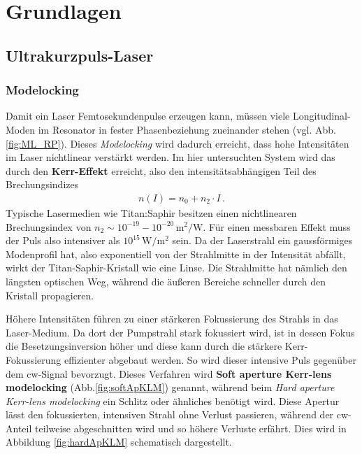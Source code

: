 \documentclass[bachelor,       %
               twoside,        %
               BCOR10mm,       %
               liststotoc,nomtotoc,bibtotoc, %
               english,ngerman, %
               final,          %
               ]{GAUBM}
\begin{document}
\chapter{Grundlagen}

\section{Ultrakurzpuls-Laser}
\subsection{Modelocking}
Damit ein Laser Femtosekundenpulse erzeugen kann, müssen viele Longitudinal-Moden im Resonator in fester Phasenbeziehung zueinander stehen (vgl. Abb.\ref{fig:ML_RP}).
Dieses \emph{Modelocking} wird dadurch erreicht, dass hohe Intensitäten im Laser nichtlinear verstärkt werden.
Im hier untersuchten System wird das durch den \textbf{Kerr-Effekt} erreicht, also den intensitätsabhängigen Teil des Brechungsindizes \cite[S.165]{agrawal_nonlinear_2001}
\begin{align}
	n(I)=n_0+n_2\cdot I\,.
	\label{eq:kerr}
\end{align}
Typische Lasermedien wie Titan:Saphir besitzen einen nichtlinearen Brechungsindex von $n_2\sim 10^{-19}-10^{-20}\,\si{\meter^2\per\watt}$.
Für einen messbaren Effekt muss der Puls also intensiver als $10^{15}\,\si{\watt\per\meter^2}$ sein.
Da der Laserstrahl ein gaussförmiges Modenprofil hat, also exponentiell von der Strahlmitte in der Intensität abfällt, wirkt der Titan-Saphir-Kristall wie eine Linse.
Die Strahlmitte hat nämlich den längsten optischen Weg, während die äußeren Bereiche schneller durch den Kristall propagieren.

Höhere Intensitäten führen zu einer stärkeren Fokussierung des Strahls in das Laser-Medium.
Da dort der Pumpstrahl stark fokussiert wird, ist in dessen Fokus die Besetzungsinversion höher und diese kann durch die stärkere Kerr-Fokussierung effizienter abgebaut werden.
So wird dieser intensive Puls gegenüber dem cw-Signal bevorzugt.
Dieses Verfahren wird \textbf{Soft aperture Kerr-lens modelocking} (Abb.\ref{fig:softApKLM}) genannt, während beim \textit{Hard aperture Kerr-lens modelocking} ein Schlitz oder ähnliches benötigt wird.
Diese Apertur lässt den fokussierten, intensiven Strahl ohne Verlust passieren, während der cw-Anteil teilweise abgeschnitten wird und so höhere Verluste erfährt.
Dies wird in Abbildung \ref{fig:hardApKLM} schematisch dargestellt.
\end{document}
